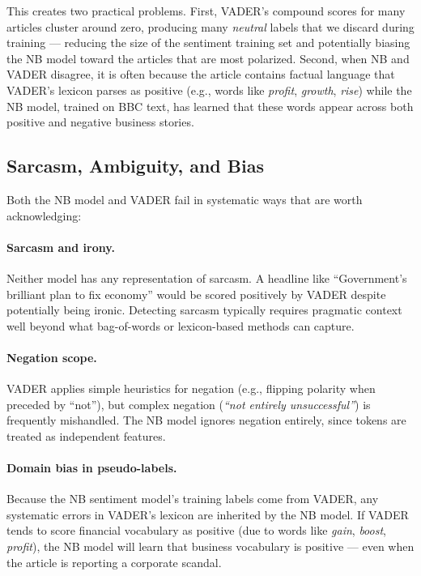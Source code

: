 This creates two practical problems. First, VADER's compound scores for many articles cluster around zero, producing many \textit{neutral} labels that we discard during training — reducing the size of the sentiment training set and potentially biasing the NB model toward the articles that are most polarized. Second, when NB and VADER disagree, it is often because the article contains factual language that VADER's lexicon parses as positive (e.g., words like \textit{profit}, \textit{growth}, \textit{rise}) while the NB model, trained on BBC text, has learned that these words appear across both positive and negative business stories.


\subsection{Sarcasm, Ambiguity, and Bias}

Both the NB model and VADER fail in systematic ways that are worth acknowledging:

\paragraph{Sarcasm and irony.} Neither model has any representation of sarcasm. A headline like ``Government's brilliant plan to fix economy'' would be scored positively by VADER despite potentially being ironic. Detecting sarcasm typically requires pragmatic context well beyond what bag-of-words or lexicon-based methods can capture.

\paragraph{Negation scope.} VADER applies simple heuristics for negation (e.g., flipping polarity when preceded by ``not''), but complex negation (\textit{``not entirely unsuccessful''}) is frequently mishandled. The NB model ignores negation entirely, since tokens are treated as independent features.

\paragraph{Domain bias in pseudo-labels.} Because the NB sentiment model's training labels come from VADER, any systematic errors in VADER's lexicon are inherited by the NB model. If VADER tends to score financial vocabulary as positive (due to words like \textit{gain}, \textit{boost}, \textit{profit}), the NB model will learn that business vocabulary is positive — even when the article is reporting a corporate scandal.

